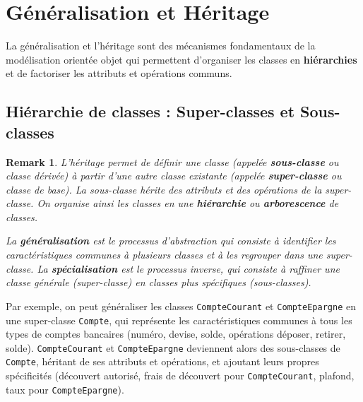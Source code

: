 \documentclass{article}
\newtheorem{remark}{Remark}
\begin{document}
\section{Généralisation et Héritage}

La généralisation et l'héritage sont des mécanismes fondamentaux de la modélisation orientée objet qui permettent d'organiser les classes en \textbf{hiérarchies} et de factoriser les attributs et opérations communs.

\subsection{Hiérarchie de classes : Super-classes et Sous-classes}
\begin{remark}
L'héritage permet de définir une classe (appelée \textbf{sous-classe} ou classe dérivée) à partir d'une autre classe existante (appelée \textbf{super-classe} ou classe de base). La sous-classe hérite des attributs et des opérations de la super-classe.  On organise ainsi les classes en une \textbf{hiérarchie} ou \textbf{arborescence} de classes.

La \textbf{généralisation} est le processus d'abstraction qui consiste à identifier les caractéristiques communes à plusieurs classes et à les regrouper dans une super-classe. La \textbf{spécialisation} est le processus inverse, qui consiste à raffiner une classe générale (super-classe) en classes plus spécifiques (sous-classes).
\end{remark}


Par exemple, on peut généraliser les classes \texttt{CompteCourant} et \texttt{CompteEpargne} en une super-classe \texttt{Compte}, qui représente les caractéristiques communes à tous les types de comptes bancaires (numéro, devise, solde, opérations déposer, retirer, solde). \texttt{CompteCourant} et \texttt{CompteEpargne} deviennent alors des sous-classes de \texttt{Compte}, héritant de ses attributs et opérations, et ajoutant leurs propres spécificités (découvert autorisé, frais de découvert pour \texttt{CompteCourant}, plafond, taux pour \texttt{CompteEpargne}).
\end{document}
